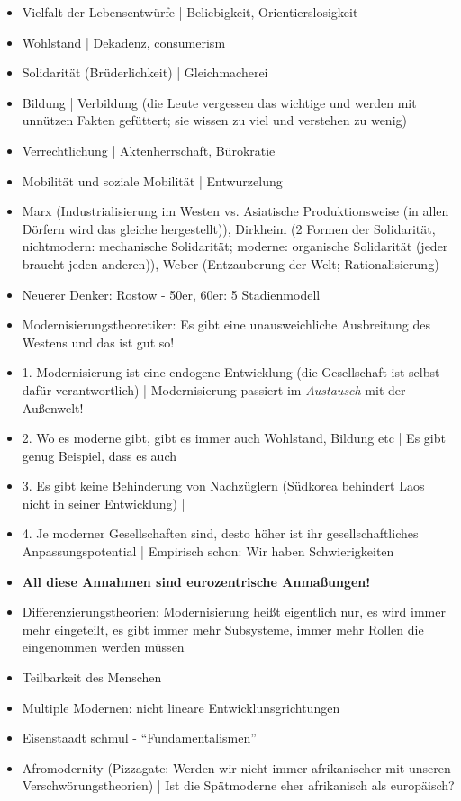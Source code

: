 \documentclass[emulatestandardclasses]{scrartcl}
\begin{document}
\begin{itemize}
  \item Vielfalt der Lebensentwürfe | Beliebigkeit, Orientierslosigkeit
  \item Wohlstand | Dekadenz, consumerism
  \item Solidarität (Brüderlichkeit) | Gleichmacherei
  \item Bildung | Verbildung (die Leute vergessen das wichtige und werden mit unnützen Fakten gefüttert; sie wissen zu viel und verstehen zu wenig)
  \item Verrechtlichung | Aktenherrschaft, Bürokratie
  \item Mobilität und soziale Mobilität | Entwurzelung
  \item Marx (Industrialisierung im Westen vs. Asiatische Produktionsweise (in allen Dörfern wird das gleiche hergestellt)), Dirkheim (2 Formen der Solidarität, nichtmodern: mechanische Solidarität; moderne: organische Solidarität (jeder braucht jeden anderen)), Weber (Entzauberung der Welt; Rationalisierung)
  \item Neuerer Denker: Rostow - 50er, 60er: 5 Stadienmodell 
  \item Modernisierungstheoretiker: Es gibt eine unausweichliche Ausbreitung des Westens und das ist gut so!
  \item 1. Modernisierung ist eine endogene Entwicklung (die Gesellschaft ist selbst dafür verantwortlich) | Modernisierung passiert im \emph{Austausch} mit der Außenwelt!
  \item 2. Wo es moderne gibt, gibt es immer auch Wohlstand, Bildung etc | Es gibt genug Beispiel, dass es auch 
  \item 3. Es gibt keine Behinderung von Nachzüglern (Südkorea behindert Laos nicht in seiner Entwicklung) | 
  \item 4. Je moderner Gesellschaften sind, desto höher ist ihr gesellschaftliches Anpassungspotential | Empirisch schon: Wir haben Schwierigkeiten
  \item \textbf{All diese Annahmen sind eurozentrische Anmaßungen!}
  \item Differenzierungstheorien: Modernisierung heißt eigentlich nur, es wird immer mehr eingeteilt, es gibt immer mehr Subsysteme, immer mehr Rollen die eingenommen werden müssen
  \item Teilbarkeit des Menschen
  \item Multiple Modernen: nicht lineare Entwicklunsgrichtungen
  \item Eisenstaadt schmul - "`Fundamentalismen"'
  \item Afromodernity (Pizzagate: Werden wir nicht immer afrikanischer mit unseren Verschwörungstheorien) | Ist die Spätmoderne eher afrikanisch als europäisch?
\end{itemize}


\newpage
\end{document}
